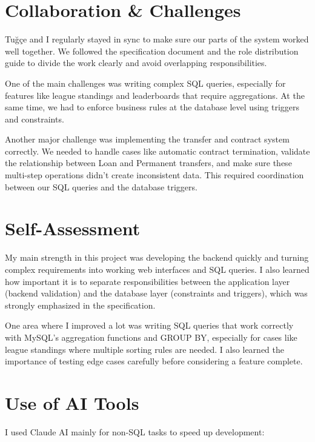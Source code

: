 \documentclass[12pt, a4paper]{article}
\begin{document}
    \section*{Collaboration \& Challenges}
    
    Tuğçe and I regularly stayed in sync to make sure our parts of the system worked well together. We followed the specification document and the role distribution guide to divide the work clearly and avoid overlapping responsibilities.
    
    One of the main challenges was writing complex SQL queries, especially for features like league standings and leaderboards that require aggregations. At the same time, we had to enforce business rules at the database level using triggers and constraints. 
    
    Another major challenge was implementing the transfer and contract system correctly. We needed to handle cases like automatic contract termination, validate the relationship between Loan and Permanent transfers, and make sure these multi-step operations didn’t create inconsistent data. This required coordination between our SQL queries and the database triggers.
    
    \section*{Self-Assessment}
    
    My main strength in this project was developing the backend quickly and turning complex requirements into working web interfaces and SQL queries. I also learned how important it is to separate responsibilities between the application layer (backend validation) and the database layer (constraints and triggers), which was strongly emphasized in the specification.
    
    One area where I improved a lot was writing SQL queries that work correctly with MySQL’s aggregation functions and GROUP BY, especially for cases like league standings where multiple sorting rules are needed. I also learned the importance of testing edge cases carefully before considering a feature complete.
    
    \section*{Use of AI Tools}
    
    I used Claude AI mainly for non-SQL tasks to speed up development:
    
\end{document}
